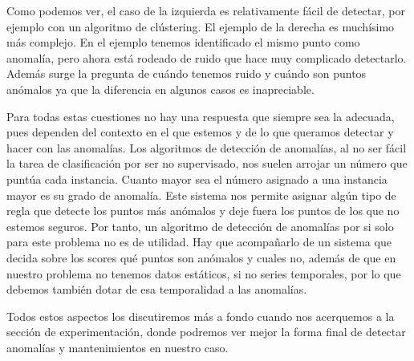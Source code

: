 Como podemos ver, el caso de la izquierda es relativamente fácil de detectar, por ejemplo con un algoritmo de clústering. El ejemplo de la derecha es muchísimo más complejo. En el ejemplo tenemos identificado el mismo punto como anomalía, pero ahora está rodeado de ruido que hace muy complicado detectarlo. Además surge la pregunta de cuándo tenemos ruido y cuándo son puntos anómalos ya que la diferencia en algunos casos es inapreciable.

Para todas estas cuestiones no hay una respuesta que siempre sea la adecuada, pues dependen del contexto en el que estemos y de lo que queramos detectar y hacer con las anomalías. Los algoritmos de detección de anomalías, al no ser fácil la tarea de clasificación por ser no supervisado, nos suelen arrojar un número que puntúa cada instancia. Cuanto mayor sea el número asignado a una instancia mayor es su grado de anomalía. Este sistema nos permite asignar algún tipo de regla que detecte los puntos más anómalos y deje fuera los puntos de los que no estemos seguros. Por tanto, un algoritmo de detección de anomalías por si solo para este problema no es de utilidad. Hay que acompañarlo de un sistema que decida sobre los scores qué puntos son anómalos y cuales no, además de que en nuestro problema no tenemos datos estáticos, si no series temporales, por lo que debemos también dotar de esa temporalidad a las anomalías.

Todos estos aspectos los discutiremos más a fondo cuando nos acerquemos a la sección de experimentación, donde podremos ver mejor la forma final de detectar anomalías y mantenimientos en nuestro caso.